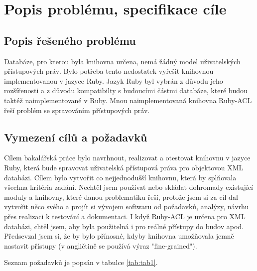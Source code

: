 \chapter{Popis problému, specifikace cíle}

\section{Popis řešeného problému}

Databáze, pro kterou byla knihovna určena, nemá žádný model uživatelských přístupových práv. Bylo potřeba tento nedostatek vyřešit knihovnou implementovanou v jazyce Ruby. Jazyk Ruby byl vybrán z důvodu jeho rozšířenosti a z důvodu kompatibilty s budoucími částmi databáze, které budou taktéž naimplementované v Ruby. Mnou naimplementovaná knihovna Ruby-ACL řeší problém se spravováním přístupových práv.

\section{Vymezení cílů a požadavků}
Cílem bakalářská práce bylo navrhnout, realizovat a otestovat knihovnu v jazyce Ruby, která bude spravovat uživatelská přístupová práva pro objektovou XML databázi.
Cílem bylo vytvořit co nejjednodušší knihovnu, která by splňovala všechna kritéria zadání. Nechtěl jsem používat nebo skládat dohromady existující moduly a knihovny, které danou problematiku řeší, protože jsem si za cíl dal vytvořit něco svého a projít si vývojem softwaru od požadavků, analýzy, návrhu přes realizaci k testování a dokumentaci. 
I když Ruby-ACL je určena pro XML databázi, chtěl jsem, aby byla použitelná i pro reálné přístupy do budov apod.
Předsevzal jsem si, že by bylo přínosné, kdyby knihovna umožňovala jemně nastavit přístupy (v angličtině se používá výraz "fine-grained").

\noindent
Seznam požadavků je popsán v tabulce  \ref{tab:tab1}.


